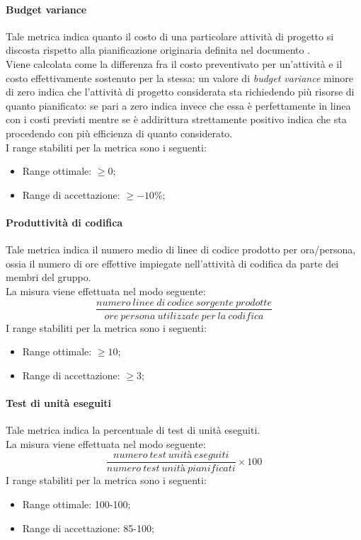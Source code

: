 			\paragraph{Budget variance}
			Tale metrica indica quanto il costo di una particolare attività di progetto si discosta rispetto alla pianificazione originaria definita nel documento \PdP. 
			\\Viene calcolata come la differenza fra il costo preventivato per un'attività e il costo effettivamente sostenuto per la stessa: un valore di \textit{budget variance} minore di zero indica che l'attività di progetto considerata sta richiedendo più risorse di quanto pianificato: se pari a zero indica invece che essa è perfettamente in linea con i costi previsti mentre se è addirittura strettamente positivo indica che sta procedendo con più efficienza di quanto considerato.
			\\I range stabiliti per la metrica sono i seguenti:
				\begin{itemize}
					\item Range ottimale: $\geq{0}$;
					\item Range di accettazione: $\geq{-10}$\%;
				\end{itemize}
				
			\paragraph{Produttività di codifica}
			Tale metrica indica il numero medio di linee di codice prodotto per ora/persona, ossia il numero di ore effettive impiegate nell'attività di codifica da parte dei membri del gruppo.
			\\La misura viene effettuata nel modo seguente:
				\begin{equation}
					\frac{numero~linee~di~codice~sorgente~prodotte}{ore~persona~utilizzate~per~la~codifica}
				\end{equation}
			I range stabiliti per la metrica sono i seguenti:
			\begin{itemize}
					\item Range ottimale: $\geq{10}$;
					\item Range di accettazione: $\geq{3}$;
				\end{itemize}
				
			\paragraph{Test di unità eseguiti}
			Tale metrica indica la percentuale di test di unità eseguiti.
			\\La misura viene effettuata nel modo seguente:
				\begin{equation}
					\frac{numero~test~unità~eseguiti}{numero~test~unità~pianificati}\times100
				\end{equation}
			I range stabiliti per la metrica sono i seguenti:
			\begin{itemize}
					\item Range ottimale: 100-100;
					\item Range di accettazione: 85-100;
				\end{itemize}
				
